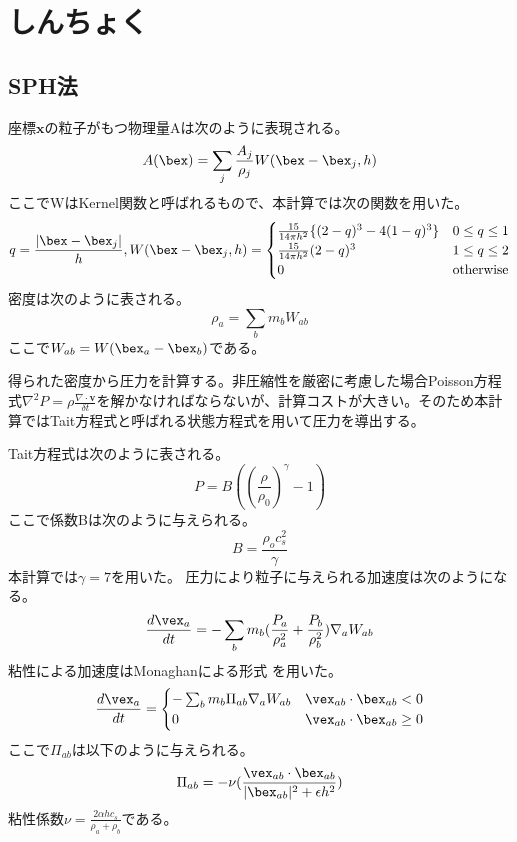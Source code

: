 \documentclass[]{jsarticle}
\begin{document}
\section{しんちょく}
\subsection{SPH法}
座標$\bm{x}$の粒子がもつ物理量Aは次のように表現される。 \cite{Becker}
\begin{equation}
A(\bex)=\sum_j \frac{A_j}{\rho_j} W(\bex-\bex_j,h)
\end{equation}
ここでWはKernel関数と呼ばれるもので、本計算では次の関数を用いた。
\begin{equation}
  q=\frac{|\bex-\bex_j|}{h}, 
  W(\bex-\bex_j,h)=\begin{cases}
    \frac{15}{14\pi h^2} \{(2-q)^3-4(1-q)^3\} & \text{$ 0 \leq q \leq 1$}\\
    \frac{15}{14\pi h^2} (2-q)^3 & \text{$1\leq q \leq 2$}\\
    0 & \text{otherwise}
\end{cases}
\end{equation}
密度は次のように表される。
\begin{equation}
\rho_{a}=\sum_bm_bW_{ab}
\end{equation}
ここで$W_{ab}=W(\bex_a-\bex_b)$である。

得られた密度から圧力を計算する。非圧縮性を厳密に考慮した場合Poisson方程式$\nabla^2P=\rho\frac{\nabla\cdot\bm{v}}{\delta t}$を解かなければならないが、計算コストが大きい。そのため本計算ではTait方程式と呼ばれる状態方程式を用いて圧力を導出する。

Tait方程式は次のように表される。
\begin{equation}
P=B((\frac{\rho}{\rho_0})^\gamma-1)
\end{equation}
ここで係数Bは次のように与えられる。
\begin{equation}
B=\frac{\rho_oc_s^2}{\gamma}
\end{equation}
本計算では$\gamma=7$を用いた。
圧力により粒子に与えられる加速度は次のようになる。
\begin{equation}
\frac{d\vex_a}{dt}=-\sum_bm_b(\frac{P_a}{\rho_a^2}+\frac{P_b}{\rho_b^2})\nabla_aW_{ab}
\end{equation}
粘性による加速度はMonaghanによる形式 \cite{Monaghan}を用いた。
\begin{equation}
\frac{d\vex_a}{dt}=\begin{cases}
  -\sum_bm_b\Pi_{ab}\nabla_aW_{ab} & \vex_{ab}\cdot\bex_{ab}<0 \\
  0 & \vex_{ab}\cdot\bex_{ab}\geq0
\end{cases}
\end{equation}
ここで$\Pi_{ab}$は以下のように与えられる。
\begin{equation}
\Pi_{ab}=-\nu(\frac{\vex_{ab}\cdot\bex_{ab}}{|\bex_{ab}|^2+\epsilon h^2})
\end{equation}
粘性係数$\nu=\frac{2\alpha h c_s}{\rho_a+\rho_b}$である。
\end{document}
